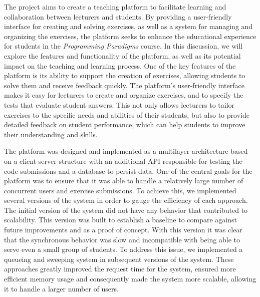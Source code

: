 The project aims to create a teaching platform to facilitate learning and collaboration between lecturers and students. 
By providing a user-friendly interface for creating and solving exercises, as well as a system for managing and organizing the exercises, the platform seeks to enhance the educational experience for students in the \textit{Programming Paradigms} course. 
In this discussion, we will explore the features and functionality of the platform, as well as its potential impact on the teaching and learning process.
One of the key features of the platform is its ability to support the creation of exercises, allowing students to solve them and receive feedback quickly.
The platform's user-friendly interface makes it easy for lecturers to create and organize exercises, and to specify the tests that evaluate student answers. This not only allows lecturers to tailor exercises to the specific needs and abilities of their students, but also to provide detailed feedback on student performance, which can help students to improve their understanding and skills.

The platform was designed and implemented as a multilayer architecture based on a client-server structure with an additional API responsible for testing the code submissions and a database to persist data. 
One of the central goals for the platform was to ensure that it was able to handle a relatively large number of concurrent users and exercise submissions. 
To achieve this, we implemented several versions of the system in order to gauge the efficiency of each approach. The initial version of the system did not have any behavior that contributed to scalability. 
This version was built to establish a baseline to compare against future improvements and as a proof of concept. With this version it was clear that the synchronous behavior was slow and incompatible with being able to serve even a small group of students.
To address this issue, we implemented a queueing and sweeping system in subsequent versions of the system. These approaches greatly improved the request time for the system, ensured more efficient memory usage and consequently made the system more scalable, allowing it to handle a larger number of users. 

